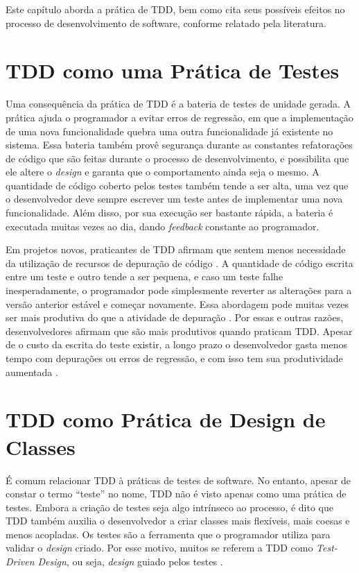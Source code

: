 Este capítulo aborda a prática de TDD, bem como cita
seus possíveis efeitos no processo de desenvolvimento de software, conforme relatado pela
literatura.

\section{TDD como uma Prática de Testes}

Uma consequência da prática de TDD é a bateria de testes de unidade gerada.
A prática ajuda o programador a evitar erros de regressão, em que a implementação de
uma nova funcionalidade quebra uma outra funcionalidade já existente no sistema.
Essa bateria também provê segurança durante as
constantes refatorações de código que são feitas durante o processo de
desenvolvimento, e possibilita que ele altere o \textit{design} e garanta que o
comportamento ainda seja o mesmo. 
A quantidade de código coberto pelos testes também tende a ser alta, uma vez que o
desenvolvedor deve sempre escrever um teste antes de implementar uma nova
funcionalidade. Além disso, por sua execução ser bastante rápida, a bateria é executada
muitas vezes ao dia, dando \textit{feedback} constante ao programador.

Em projetos novos, praticantes de TDD afirmam que sentem menos necessidade da
utilização de recursos de depuração de código \cite{george-williams-experiment} 
\cite{janzen-arch-improvement}. 
A quantidade de código
escrita entre um teste e outro tende a ser pequena, e caso um teste falhe
inesperadamente, o programador pode simplesmente reverter as alterações para a 
versão anterior estável e começar novamente. Essa abordagem pode muitas vezes
ser mais produtiva do que a atividade de depuração 
\cite{janzen-arch-improvement}. Por essas e outras razões, desenvolvedores afirmam 
que são mais produtivos quando praticam TDD. Apesar de o custo da escrita do teste
existir, a longo prazo o desenvolvedor gasta menos tempo com depurações ou 
erros de regressão, e com isso tem sua produtividade aumentada
\cite{george-e-williams}.

\section{TDD como Prática de Design de Classes}
\label{cap:tdd-e-design}

É comum relacionar TDD à práticas de testes de software. No entanto, apesar de constar o
termo ``teste'' no nome, TDD não é visto apenas como uma prática de testes.
Embora a criação de testes seja algo intrínseco ao processo, é dito que TDD também 
auxilia o desenvolvedor a criar classes mais flexíveis, mais coesas e
menos acopladas. Os testes são a ferramenta que o programador utiliza para
validar o \textit{design} criado. Por esse motivo, muitos se referem a TDD como
\textit{Test-Driven Design}, ou seja, \textit{design} guiado pelos testes
\cite{tdd-taxonomy}.

